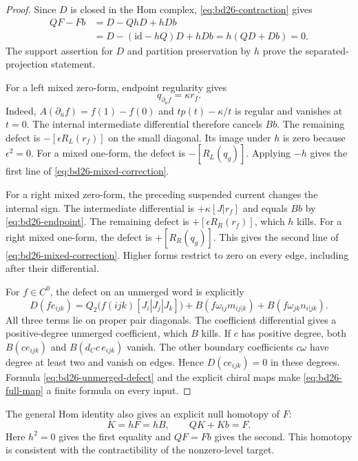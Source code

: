 \begin{proof}
Since $D$ is closed in the Hom complex, \eqref{eq:bd26-contraction} gives
\[
 \begin{aligned}
 QF-Fb
 &=D-QhD+hDb\\
 &=D-(\mathrm{id}-hQ)D+hDb
 =h(QD+Db)=0.
 \end{aligned}
\]
The support assertion for $D$ and partition preservation by $h$ prove the separated-projection statement.

For a left mixed zero-form, endpoint regularity gives
\begin{equation}\label{eq:bd26-endpoint}
 q_{\partial_uf}=\kappa r_f.
\end{equation}
Indeed, $A(\partial_uf)=f(1)-f(0)$ and
$tp(t)-\kappa/t$ is regular and vanishes at $t=0$.
The internal intermediate differential therefore cancels $Bb$.
The remaining defect is $-[\epsilon R_L(r_f)]$ on the small diagonal.
Its image under $h$ is zero because $\epsilon^2=0$.
For a mixed one-form, the defect is $-[R_L(q_g)]$.
Applying $-h$ gives the first line of \eqref{eq:bd26-mixed-correction}.

For a right mixed zero-form, the preceding suspended current changes the internal sign.
The intermediate differential is $+\kappa[J|r_f]$ and equals $Bb$ by \eqref{eq:bd26-endpoint}.
The remaining defect is $+[\epsilon R_R(r_f)]$, which $h$ kills.
For a right mixed one-form, the defect is $+[R_R(q_g)]$.
This gives the second line of \eqref{eq:bd26-mixed-correction}.
Higher forms restrict to zero on every edge, including after their differential.

For $f\in C^0$, the defect on an unmerged word is explicitly
\begin{equation}\label{eq:bd26-unmerged-defect}
 D(fe_{ijk})=
 Q_2\bigl(f(ijk)[J_i|J_j|J_k]\bigr)
 +B(f\omega_{ij}m_{ij|k})+B(f\omega_{jk}n_{i|jk}).
\end{equation}
All three terms lie on proper pair diagonals.
The coefficient differential gives a positive-degree unmerged coefficient, which $B$ kills.
If $c$ has positive degree, both $B(ce_{ijk})$ and $B(d_Cc\,e_{ijk})$ vanish.
The other boundary coefficients $c\omega$ have degree at least two and vanish on edges.
Hence $D(ce_{ijk})=0$ in these degrees.
Formula \eqref{eq:bd26-unmerged-defect} and the explicit chiral maps make \eqref{eq:bd26-full-map} a finite formula on every input.
\end{proof}

The general Hom identity also gives an explicit null homotopy of $F$:
\begin{equation}\label{eq:bd26-null}
 K=hF=hB,
 \qquad QK+Kb=F.
\end{equation}
Here $h^2=0$ gives the first equality and $QF=Fb$ gives the second.
This homotopy is consistent with the contractibility of the nonzero-level target.

